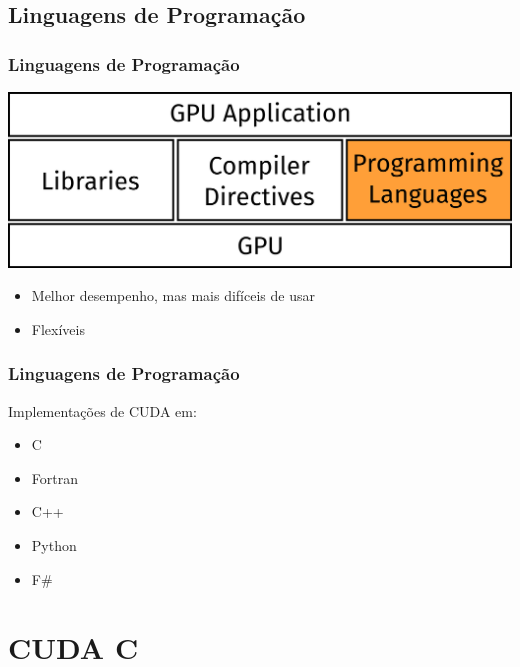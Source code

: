 \documentclass[10pt, compress]{beamer}
\begin{document}
\subsection{Linguagens de Programação}

\begin{frame}
    \frametitle{Linguagens de Programação}
    \begin{center}
        \includegraphics[width=.6\textwidth]{accel_apps_lang}
    \end{center}
    \pause

    \begin{itemize}
        \item Melhor desempenho, mas mais difíceis de usar
            \pause
        \item Flexíveis
    \end{itemize}
\end{frame}

\begin{frame}
    \frametitle{Linguagens de Programação}
    Implementações de CUDA em:
    \begin{itemize}
        \item \alert{C}
        \item Fortran
        \item C++
        \item Python
        \item F\#
    \end{itemize}
\end{frame}

\section{CUDA C}
\end{document}
